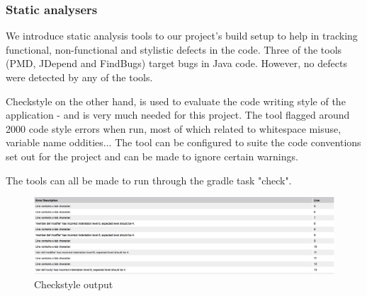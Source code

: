\subsubsection{Static analysers}
\label{sec:static-analysers}
We introduce static analysis tools to our project's build setup to help in tracking functional, non-functional and stylistic defects in the code. Three of the tools (PMD, JDepend and FindBugs) target bugs in Java code. However, no defects were detected by any of the tools.
\par 
Checkstyle on the other hand, is used to evaluate the code writing style of the application - and is very much needed for this project. The tool flagged around 2000 code style errors when run, most of which related to whitespace misuse, variable name oddities... The tool can be configured to suite the code conventions set out for the project and can be made to ignore certain warnings. 
\par
The tools can all be made to run through the gradle task "check". 

\begin{figure}[H]
\centering
\includegraphics[width=\textwidth]{res/checkstyle.png}
\caption{Checkstyle output}
\end{figure}